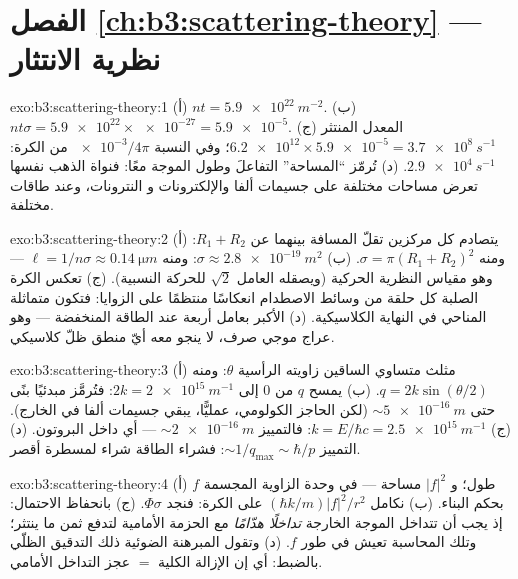 \section*{الفصل \ref{ch:b3:scattering-theory} --- نظرية الانتثار}

\begin{solution}{exo:b3:scattering-theory:1}
(أ) $nt = \qty{5.9e22}{m^{-2}}$. (ب) $nt\sigma = \num{5.9e22}
\times \num{e-27} = \num{5.9e-5}$. (ج) المعدل المنتثر
$\num{6.2e12} \times \num{5.9e-5} = \qty{3.7e8}{s^{-1}}$؛ وفي
النسبة $\num{e-3}/4\pi$ من الكرة: $\qty{2.9e4}{s^{-1}}$. (د)
تُرمّز ``المساحة'' التفاعلَ وطول الموجة معًا: فنواة الذهب
نفسها تعرض مساحات مختلفة على جسيمات ألفا والإلكترونات و
النترونات، وعند طاقات مختلفة.
\end{solution}

\begin{solution}{exo:b3:scattering-theory:2}
(أ) يتصادم كل مركزين تقلّ المسافة بينهما عن $R_1 + R_2$: ومنه $\sigma = \pi(R_1 +
R_2)^2$. (ب) $\sigma \approx \qty{2.8e-19}{m^2}$: ومنه $\ell = 1/n\sigma
\approx \qty{0.14}{\micro m}$ --- وهو مقياس النظرية الحركية (ويصقله
العامل $\sqrt2$ للحركة النسبية). (ج) تعكس الكرة الصلبة
كل حلقة من وسائط الاصطدام انعكاسًا منتظمًا على الزوايا:
فتكون متماثلة المناحي في النهاية الكلاسيكية. (د)  الأكبر
بعامل أربعة عند الطاقة المنخفضة --- وهو عراج موجي صرف، لا ينجو معه
أيّ منطق ظلّ كلاسيكي.
\end{solution}

\begin{solution}{exo:b3:scattering-theory:3}
(أ) مثلث متساوي الساقين زاويته الرأسية $\theta$: ومنه $q =
2k\sin(\theta/2)$. (ب) يمسح $q$ من $0$ إلى $2k = \qty{2e15}{
m^{-1}}$: فتُرمَّز مبدئيًا بنًى حتى $\sim\qty{5e-16}{m}$
(لكن الحاجز الكولومي، عمليًّا، يبقي جسيمات ألفا
في الخارج). (ج) $k = E/\hbar c = \qty{2.5e15}{m^{-1}}$: فالتمييز
$\sim\qty{2e-16}{m}$ --- أي داخل البروتون. (د) التمييز
$\sim 1/q_{\max} \sim \hbar/p$: فشراء الطاقة شراء لمسطرة أقصر.
\end{solution}

\begin{solution}{exo:b3:scattering-theory:4}
(أ) $f$ طول؛ و $|f|^2$ مساحة --- في وحدة الزاوية المجسمة
بحكم البناء. (ب) نكامل $(\hbar k/m)|f|^2/r^2$ على
الكرة: فنجد $\Phi\sigma$. (ج) بانحفاظ الاحتمال: إذ يجب أن تتداخل الموجة
الخارجة \emph{تداخلًا هدّامًا} مع الحزمة الأمامية لتدفع
ثمن ما ينتثر؛ وتلك المحاسبة تعيش في طور $f$. (د)
وتقول المبرهنة الضوئية ذلك التدقيق الظلّي بالضبط: أي إن الإزالة
الكلية $=$ عجز التداخل الأمامي.
\end{solution}

